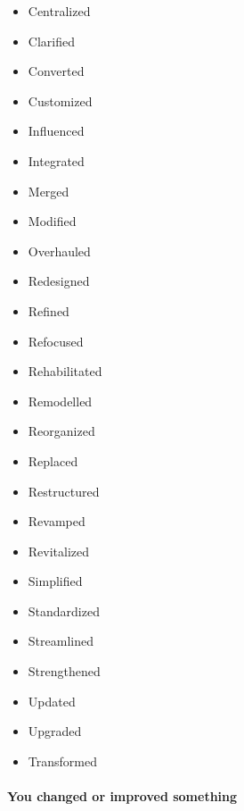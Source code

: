 \documentclass{article}
\begin{document}
\begin{longtable}
\begin{minipage}[t]{0.47\columnwidth}
\begin{itemize}
\item
  Centralized
\item
  Clarified
\item
  Converted
\item
  Customized
\item
  Influenced
\item
  Integrated
\item
  Merged
\item
  Modified
\item
  Overhauled
\item
  Redesigned
\item
  Refined
\item
  Refocused
\item
  Rehabilitated
\item
  Remodelled
\item
  Reorganized
\item
  Replaced
\item
  Restructured
\item
  Revamped
\item
  Revitalized
\item
  Simplified
\item
  Standardized
\item
  Streamlined
\item
  Strengthened
\item
  Updated
\item
  Upgraded
\item
  Transformed
\end{itemize}\strut
\end{minipage}\tabularnewline
\begin{minipage}[t]{0.47\columnwidth}\raggedright
\hypertarget{you-changed-or-improved-something-1}{%
\paragraph{You changed or improved
something}\label{you-changed-or-improved-something-1}}


\end{minipage}
\end{longtable}
\end{document}

